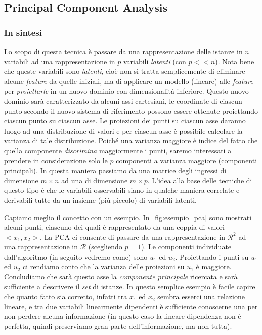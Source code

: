 \subsection{Principal Component Analysis}
\subsubsection{In sintesi}
Lo scopo di questa tecnica è passare da una rappresentazione delle istanze in $n$ variabili ad una rappresentazione in $p$ variabili \emph{latenti} (con $p<<n$). Nota bene che queste variabili sono \emph{latenti}, cioè non si tratta semplicemente di eliminare alcune \emph{feature} da quelle iniziali, ma di applicare un modello (lineare) alle \emph{feature} per \emph{proiettarle} in un nuovo dominio con dimensionalità inferiore. Questo nuovo dominio sarà caratterizzato da alcuni assi cartesiani, le coordinate di ciascun punto secondo il nuovo sistema di riferimento possono essere ottenute proiettando ciascun punto su ciascun asse. Le proiezioni dei punti su ciascun asse daranno luogo ad una distribuzione di valori e per ciascun asse è possibile calcolare la varianza di tale distribuzione. Poiché una varianza maggiore è indice del fatto che quella componente \emph{discrimina} maggiormente i punti, saremo interessati a prendere in considerazione solo le $p$ componenti a varianza maggiore (componenti principali). In questa maniera passiamo da una matrice degli ingressi di dimensione $m \times n$ ad una di dimensione $m \times p$. L'idea alla base delle tecniche di questo tipo è che le variabili osservabili siano in qualche maniera correlate e derivabili tutte da un insieme (più piccolo) di variabili latenti.

Capiamo meglio il concetto con un esempio. In~\autoref{fig:esempio_pca} sono mostrati alcuni punti, ciascuno dei quali è rappresentato da una coppia di valori $<x_1, x_2>$. La PCA ci consente di passare da una rappresentazione in $\mathcal{R}^2$ ad una rappresentazione in $\mathcal{R}$ (scegliendo $p=1$). Le componenti individuate dall'algoritmo (in seguito vedremo come) sono $u_1$ ed $u_2$. Proiettando i punti su $u_1$ ed $u_2$ ci rendiamo conto che la varianza delle proiezioni su $u_1$ è maggiore. Concludiamo che sarà questo asse la \emph{componente principale} ricercata e sarà sufficiente a descrivere il \emph{set} di istanze. In questo semplice esempio è facile capire che quanto fatto sia corretto, infatti tra $x_1$ ed $x_2$ sembra esserci una relazione lineare, e tra due variabili linearmente dipendenti è sufficiente conoscerne una per non perdere alcuna informazione (in questo caso la lineare dipendenza non è perfetta, quindi preserviamo gran parte dell'informazione, ma non tutta).

